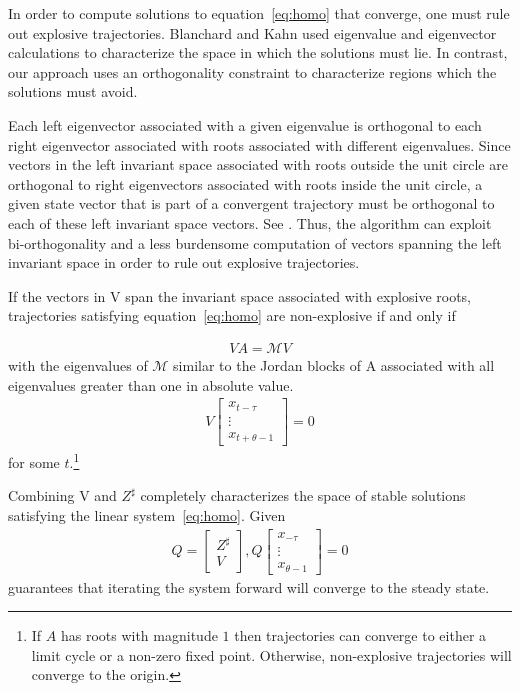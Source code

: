 \documentclass[12pt]{elsart}
\begin{document}
\label{sec:invariantSpace}
In order to compute solutions to equation~\ref{eq:homo} that converge, 
one must rule out explosive trajectories. Blanchard and Kahn\cite{blanchard80} 
used eigenvalue and eigenvector calculations to characterize the space in 
which the solutions must lie. In contrast, our approach uses
an orthogonality constraint to characterize regions which the solutions 
must avoid.



Each left  eigenvector associated with a given eigenvalue
is orthogonal to each right eigenvector associated 
with roots associated with  different eigenvalues.
Since vectors in the left invariant space
associated with roots outside the unit circle are orthogonal to right eigenvectors associated with roots 
inside the
unit circle, a given state vector that is part of a convergent trajectory
must be orthogonal to each of these left invariant space vectors. See \cite{anderson10}.
Thus, the algorithm can exploit bi-orthogonality and a
less burdensome computation of vectors spanning the 
left invariant space  in order to rule out explosive
trajectories. 



If the vectors in V span the invariant space associated with explosive
roots,  trajectories satisfying equation~\ref{eq:homo} 
are non-explosive if and only if

\begin{gather}
 V A =   \mathcal{M}  V 
\end{gather}
with the eigenvalues of $ \mathcal{M}$ similar to the 
Jordan blocks of A associated with all eigenvalues
greater than one in absolute value.
\begin{gather}
V 
\begin{bmatrix}
  x_{t-\tau}\\
\vdots\\
  x_{t+\theta-1}
\end{bmatrix}=0
\end{gather}
for some $t$.\footnote{
If $A$ has roots with magnitude $1$ then trajectories can converge to 
either a limit cycle or a non-zero fixed point. Otherwise,
non-explosive trajectories will converge to the origin.}





Combining V and $Z^\sharp$  completely characterizes the space of 
stable solutions satisfying the linear system~\ref{eq:homo}.
Given
\begin{gather}
  Q= 
  \begin{bmatrix}
    Z^{\sharp}\\V
  \end{bmatrix},
Q
\begin{bmatrix}
  x_{-\tau} \\ \vdots \\ x_{\theta-1}
\end{bmatrix}=0 
\end{gather}
guarantees that iterating the system forward will converge to the steady state.
\end{document}
